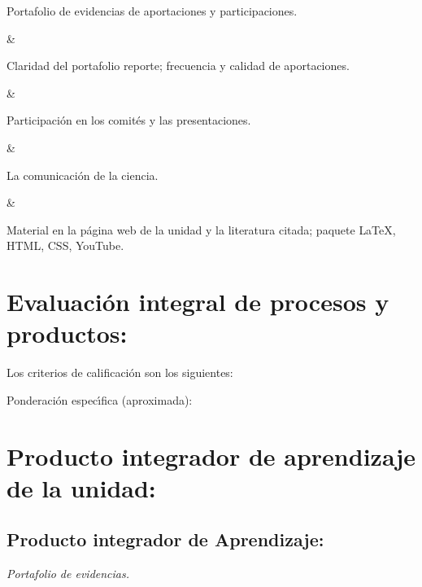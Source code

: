\quad



Portafolio de evidencias de aportaciones y participaciones.

&

Claridad del portafolio reporte; frecuencia y calidad de aportaciones.

&

Participaci\'{o}n en los comit\'{e}s y las presentaciones.

&

La comunicaci\'{o}n de la ciencia.

&

Material en la p\'{a}gina web de la unidad y la literatura citada;
paquete {\LaTeX}, HTML, CSS, YouTube.



\section{Evaluaci\'{o}n integral de procesos y productos:}

\quad

Los criterios de calificaci\'{o}n son los siguientes:

  
Ponderaci\'{o}n espec\'{\i}fica (aproximada):



\section{Producto integrador de aprendizaje de la unidad:}

\subsection{Producto integrador de Aprendizaje:}

\quad

{\em Portafolio de evidencias.}




